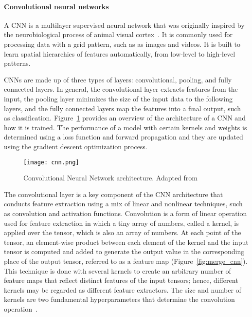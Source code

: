 \paragraph{Convolutional neural networks} 

A \gls{CNN} is a multilayer supervised neural network that was originally inspired by the neurobiological process of animal visual cortex~\cite{Ganatra2018ATools}. It is commonly used for processing data with a grid pattern, such as as images and videos. It is built to learn spatial hierarchies of features automatically, from low-level to high-level patterns. 

\gls{CNN}s are made up of three types of layers: convolutional, pooling, and fully connected layers. In general, the convolutional layer extracts features from the input, the pooling layer minimizes the size of the input data to the following layers, and the fully connected layers map the features into a final output, such as classification. Figure~\ref{fig:cnn} provides an overview of the architecture of a \gls{CNN} and how it is trained. The performance of a model with certain kernels and weights is determined using a loss function and forward propagation and they are updated using the gradient descent optimization process.

\begin{figure}[htbp]
    \centering
    \texttt{[image: cnn.png]}
    \caption{Convolutional Neural Network architecture. Adapted from~\cite{Yamashita2018ConvolutionalRadiology}}
    \label{fig:cnn}
\end{figure}

The convolutional layer is a key component of the \gls{CNN} architecture that conducts feature extraction using a mix of linear and nonlinear techniques, such as convolution and activation functions. Convolution is a form of linear operation used for feature extraction in which a tiny array of numbers, called a kernel, is applied over the tensor, which is also an array of numbers. At each point of the tensor, an element-wise product between each element of the kernel and the input tensor is computed and added to generate the output value in the corresponding place of the output tensor, referred to as a feature map (Figure~\ref{fig:merge_cnn}). This technique is done with several kernels to create an arbitrary number of feature maps that reflect distinct features of the input tensors; hence, different kernels may be regarded as different feature extractors. The size and number of kernels are two fundamental hyperparameters that determine the convolution operation~\cite{Yamashita2018ConvolutionalRadiology}.

